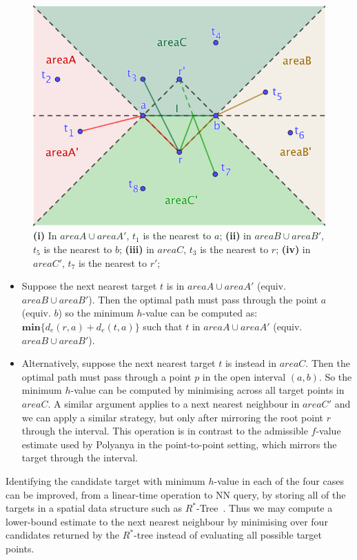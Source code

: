 \begin{figure}[!hbt]
  \centering
  \includegraphics[width=.7\linewidth]{pic/heuristic.png}
  \caption{
    \small  
    \textbf{(i)} In $areaA \cup areaA'$, $t_1$ is the nearest to $a$;
    \textbf{(ii)} in $areaB \cup areaB'$, $t_5$ is the nearest to $b$;
    \textbf{(iii)} in $areaC$, $t_3$ is the nearest to $r$;
    \textbf{(iv)} in $areaC'$, $t_7$ is the nearest to $r'$; 
  }
  \label{fa}
\end{figure}
\begin{itemize}
  \item Suppose the next nearest target $t$ is in $areaA \cup areaA'$ (equiv. $areaB \cup areaB'$).
    Then the optimal path must pass through the point $a$ (equiv. $b$) so the minimum $h$-value can be computed as:
    $\mathbf{min}\{d_e(r, a) + d_e(t, a)\}$ such that $t$ in $areaA \cup areaA'$
    (equiv. $areaB \cup areaB'$).
  \item Alternatively, suppose the next nearest target $t$ is instead in $areaC$.
    Then the optimal path must pass through a point $p$ in the open interval $(a, b)$.
    So the minimum $h$-value can be computed by minimising across all target points in $areaC$.
    A similar argument applies to a next nearest neighbour in $areaC'$ and we can apply a similar strategy,
    but only after mirroring the root point $r$ through the interval.
    This operation is in contrast to the admissible $f$-value estimate used by Polyanya in the point-to-point setting,
    which mirrors the target through the interval.
\end{itemize}
\noindent
Identifying the candidate target with minimum $h$-value in each of the four cases can be improved,
from a linear-time operation to NN query, by storing all of the
targets in a spatial data structure such as $R^*$-Tree~\cite{beckmann1990r}.
Thus we may compute a lower-bound estimate to the next nearest neighbour by minimising over
four candidates returned by the $R^*$-tree instead of evaluating all possible target points.

